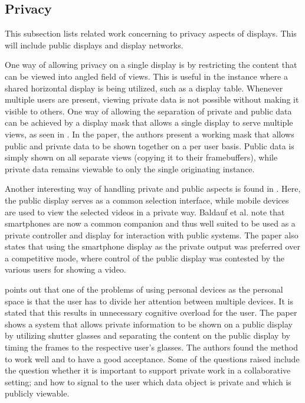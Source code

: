 \subsection{Privacy}

This subsection lists related work concerning to privacy aspects of displays.
This will include public displays and display networks.

One way of allowing privacy on a single display is by restricting the content that can be viewed into angled field of views.
This is useful in the instance where a shared horizontal display is being utilized, such as a display table.
Whenever multiple users are present, viewing private data is not possible without making it visible to others.
One way of allowing the separation of private and public data can be achieved by a display mask that allows a single display to serve multiple views, as seen in \cite{smith2008public}.
In the paper, the authors present a working mask that allows public and private data to be shown together on a per user basis.
Public data is simply shown on all separate views (copying it to their framebuffers), while private data remains viewable to only the single originating instance.

Another interesting way of handling private and public aspects is found in \cite{baldauf2012private}.
Here, the public display serves as a common selection interface, while mobile devices are used to view the selected videos in a private way.
Baldauf et al. note that smartphones are now a common companion and thus well suited to be used as a private controller and display for interaction with public systems.
The paper also states that using the smartphone display as the private output was preferred over a competitive mode, where control of the public display was contested by the various users for showing a video.

\cite{shoemaker2001single} points out that one of the problems of using personal devices as the personal space is that the user has to divide her attention between multiple devices.
It is stated that this results in unnecessary cognitive overload for the user.
The paper shows a system that allows private information to be shown on a public display by utilizing shutter glasses and separating the content on the public display by timing the frames to the respective user's glasses.
The authors found the method to work well and to have a good acceptance.
Some of the questions raised include the question whether it is important to support private work in a collaborative setting; and how to signal to the user which data object is private and which is publicly viewable.

